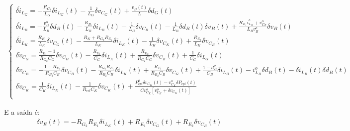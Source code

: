 \documentclass{article}
\newcommand{\ds}{\displaystyle}
\begin{document}
\begin{gather}
  \begin{cases}
    \delta \dot{i}_{L_G} = \ds - \frac{R_{G_1}}{L_G} \delta i_{L_G}(t) - \frac{1}{L_G} \delta v_{C_G}(t) + \frac{v_B(t)}{L} \delta d_G(t) \\[14pt]
    \delta \dot{i}_{L_B} = \ds - \frac{v_B^o}{L_B} \delta d_B(t) - \frac{R_{B_1}}{L_B} \delta i_{L_B}(t)
    - \frac{1}{L_B} \delta v_{C_B}(t) - \frac{1}{L_B} \delta d_B(t) \delta v_B(t)
    + \frac{R_{B_1} i_{L_B}^o + v_{C_B}^o}{L_B v_B^o} \delta v_B(t)                                                                       \\[14pt]
    \delta \dot{i}_{L_K} = \ds \frac{R_{E_1}}{L_K} \delta v_{C_G}(t) - \frac{R_K+R_{G_2}R_{E_1}}{L_K} \delta i_{L_K}(t)
    - \frac{1}{L_K} \delta v_{C_K}(t) + \frac{R_{E_2}}{L_K} \delta v_{C_B}(t)                                                             \\[14pt]
    \delta \dot{v}_{C_G} = \ds \frac{R_{E_1} - 1}{R_{G_2} C_G} \delta v_{C_G}(t)
    - \frac{R_{E_1}}{C_G} \delta i_{L_K}(t)
    + \frac{R_{E_2}}{R_{G_2} C_G} \delta v_{C_B}(t) + \frac{1}{C_G} \delta i_{L_G}(t)                                                     \\[14pt]
    \delta \dot{v}_{C_B} = \ds - \frac{1 - R_{E_2}}{R_{B_2}C_B} \delta v_{C_B}(t)
    - \frac{R_{G_2} R_{E_1}}{R_{B_2}C_B} \delta i_{L_K}(t)
    + \frac{R_{E_1}}{R_{B_2}C_B} \delta v_{C_G}(t)
    + \frac{1 - d_B^o}{C_B} \delta i_{L_B}(t)
    - i_{L_B}^o \delta d_B(t) - \delta i_{L_B}(t) \delta d_B(t)                                                                           \\[14pt]
    \delta \dot{v}_{C_K} = \ds \frac{1}{C_K} \delta i_{L_K}(t)
    - \frac{1}{R_{crl} C_K} \delta v_{C_K}(t)
    + \frac{P_{cpl}^o \delta v_{C_K}(t) - v_{C_K}^o \delta P_{cpl}(t)}{Cv_{C_K}^o\left[v_{C_K}^o + \delta v_{C_K}(t)\right]}              \\[14pt]
  \end{cases}
\end{gather}

E a saída é:
\begin{gather}
  \delta v_E(t) = - R_{G_2} R_{E_1} \delta i_{L_K}(t) + R_{E_1} \delta v_{C_G}(t) + R_{E_2} \delta v_{C_B}(t)
\end{gather}
\end{document}
